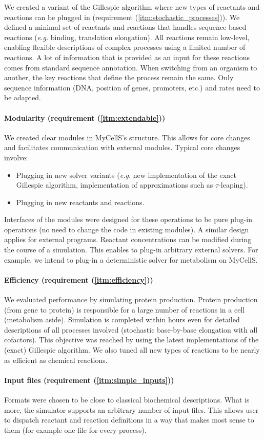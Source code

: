 We created a variant of the Gillespie algorithm where new types of reactants
and reactions can be plugged in (requirement (\ref{itm:stochastic_processes})).
We defined a minimal set of reactants and reactions that handles
sequence-based reactions (\textit{e.g.} binding, translation elongation).
All reactions remain low-level, enabling flexible descriptions of
complex processes using a limited number of reactions.
A lot of information that is provided as an input for these reactions comes from
standard sequence annotation.
When switching from an organism to another, the key reactions that define the
process remain the same.
Only sequence information (DNA, position of genes, promoters, etc.) and rates
need to be adapted.

\paragraph{Modularity (requirement (\ref{itm:extendable}))}
We created clear modules in MyCellS's structure.
This allows for core changes and facilitates communication with external modules.
Typical core changes involve:
\begin{itemize}
  \item Plugging in new solver variants
  (\textit{e.g.} new implementation of the  exact Gillespie algorithm,
  implementation of approximations such as $\tau$-leaping).
  \item Plugging in new reactants and reactions.
\end{itemize}
Interfaces of the modules were designed for these operations to be pure
plug-in operations (no need to change the code in existing modules).
A similar design applies for external programs.
Reactant concentrations can be modified during the course of a simulation.
This enables to plug-in arbitrary external solvers.
For example, we intend to plug-in a deterministic solver for metabolism on
MyCellS.

\paragraph{Efficiency (requirement (\ref{itm:efficiency}))}
We evaluated performance by simulating protein production.
Protein production (from gene to protein) is responsible for
a large number of reactions in a cell (metabolism aside).
Simulation is completed within hours even for detailed descriptions of all
processes involved (stochastic base-by-base elongation with all cofactors).
This objective was reached by using the latest implementations
of the (exact) Gillespie algorithm.
We also tuned all new types of reactions to be nearly as efficient as chemical
reactions.

\paragraph{Input files (requirement (\ref{itm:simple_inputs}))}
Formats were chosen to be close to classical biochemical descriptions.
What is more, the simulator supports an arbitrary number of input files.
This allows user to dispatch reactant and reaction definitions in a way that
makes most sense to them (for example one file for every process).
